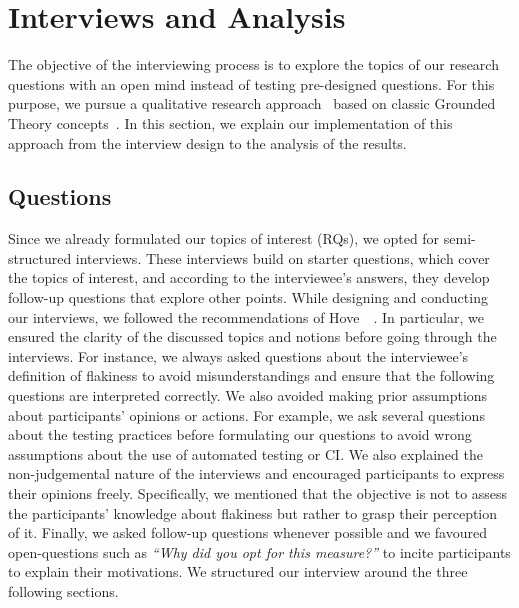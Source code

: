 \section{Interviews and Analysis}
\label{sec:survey-interviews}

The objective of the interviewing process is to explore the topics of our research questions with an open mind instead of testing pre-designed questions.
For this purpose, we pursue a qualitative research approach~\cite{creswell2017research} based on classic Grounded Theory concepts~\cite{adolph2011using}. 
In this section, we explain our implementation of this approach from the interview design to the analysis of the results.
\subsection{Questions}
Since we already formulated our topics of interest (RQs), we opted for semi-structured interviews.
These interviews build on starter questions, which cover the topics of interest, and according to the interviewee's answers, they develop follow-up questions that explore other points.
While designing and conducting our interviews, we followed the recommendations of Hove~\etal~\cite{hove2005experiences}.
In particular, we ensured the clarity of the discussed topics and notions before going through the interviews.
For instance, we always asked questions about the interviewee's definition of flakiness to avoid misunderstandings and ensure that the following questions are interpreted correctly.
We also avoided making prior assumptions about participants' opinions or actions.
For example, we ask several questions about the testing practices before formulating our questions to avoid wrong assumptions about the use of automated testing or CI. 
We also explained the non-judgemental nature of the interviews and encouraged participants to express their opinions freely.
Specifically, we mentioned that the objective is not to assess the participants' knowledge about flakiness but rather to grasp their perception of it.
Finally, we asked follow-up questions whenever possible and we favoured open-questions such as \textit{``Why did you opt for this measure?''} to incite participants to explain their motivations.
We structured our interview around the three following sections.
